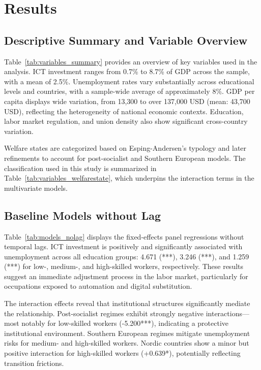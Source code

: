 
\section{Results}

\subsection{Descriptive Summary and Variable Overview}



Table~\ref{tab:variables_summary} provides an overview of key variables used in the analysis. ICT 
investment ranges from 0.7\% to 8.7\% of GDP across the sample, with a mean of 2.5\%. Unemployment 
rates vary substantially across educational levels and countries, with a sample-wide average of 
approximately 8\%. GDP per capita displays wide variation, from 13,300 to over 137,000 USD (mean: 
43,700 USD), reflecting the heterogeneity of national economic contexts. Education, labor market 
regulation, and union density also show significant cross-country variation.



Welfare states are categorized based on Esping-Andersen’s typology and later refinements to account 
for post-socialist and Southern European models. The classification used in this study is summarized 
in Table~\ref{tab:variables_welfarestate}, which underpins the interaction terms in the multivariate 
models.

\subsection{Baseline Models without Lag}



Table~\ref{tab:models_nolag} displays the fixed-effects panel regressions without temporal lags. ICT 
investment is positively and significantly associated with unemployment across all education groups: 
4.671 (***), 3.246 (***), and 1.259 (***) for low-, medium-, and high-skilled workers, respectively. 
These results suggest an immediate adjustment process in the labor market, particularly for 
occupations exposed to automation and digital substitution.

The interaction effects reveal that institutional structures significantly mediate the relationship. 
Post-socialist regimes exhibit strongly negative interactions—most notably for low-skilled workers 
(-5.200***), indicating a protective institutional environment. Southern European regimes mitigate 
unemployment risks for medium- and high-skilled workers. Nordic countries show a minor but positive 
interaction for high-skilled workers (+0.639*), potentially reflecting transition frictions.

